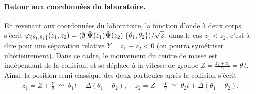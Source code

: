 





\paragraph{Retour aux coordonnées du laboratoire.}

En revenant aux coordonnées du laboratoire, la fonction d’onde à deux corps s’écrit
\(
	\varphi_{\{\theta_1 , \theta_2\}} (z_1, z_2) 
	= \langle \emptyset \vert \hat{\bm{\Psi}} (z_1)\hat{\bm{\Psi}} (z_2) \vert \{\theta_1, \theta_2\} \rangle/\sqrt{2},
\)
dans le cas \(z_1 < z_2\), c’est-à-dire pour une séparation relative \(Y = z_1 - z_2 < 0\) (on pourra symétriser ultérieurement).  
Dans ce cadre, le mouvement du centre de masse est indépendant de la collision, et se déplace à la vitesse de groupe
\(
	Z = \frac{z_1 + z_2}{2} = \overline{\theta}\,t.
\)
Ainsi, la position semi-classique des deux particules après la collision s’écrit
\begin{eqnarray}
	z_1 = Z + \frac{Y}{2} \;\simeq\; \theta_1 t - \Delta(\theta_1 - \theta_2),\quad
	z_2 = Z - \frac{Y}{2} \;\simeq\; \theta_2 t + \Delta(\theta_1 - \theta_2).
\end{eqnarray}

